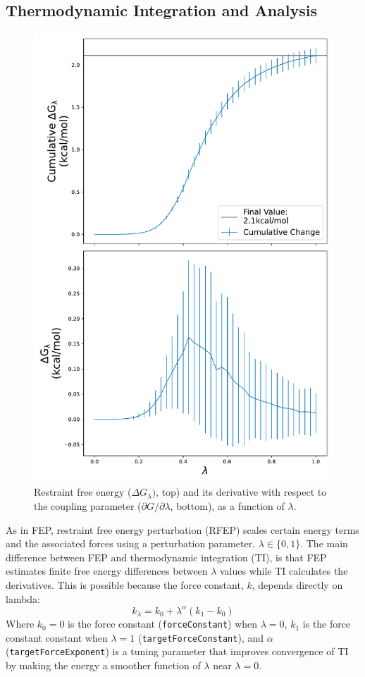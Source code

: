 \documentclass[9pt,tutorial]{Styling/livecoms}
\begin{document}
\subsection{Thermodynamic Integration and Analysis}
\begin{figure}[!htb]
    \includegraphics[width=0.95\linewidth]{RFEP}
    \caption{Restraint free energy ($\Delta G_\lambda)$, top) and its derivative with respect to the coupling parameter ($\partial G/\partial\lambda$, bottom), as a function of $\lambda$.}\label{fig:RFEP2}
\end{figure}
As in FEP, restraint free energy perturbation (RFEP) scales certain energy terms and the associated forces using a perturbation parameter, $\lambda\in \{0,1\}$.
The main difference between FEP and thermodynamic integration (TI), is that FEP estimates finite free energy differences between $\lambda$ values while TI calculates the derivatives. This is possible because the force constant, $k$, depends directly on lambda:
 \begin{equation}\label{eq:kl}
     k_\lambda = k_0 + \lambda^\alpha (k_1-k_0)
 \end{equation}
Where $k_0 = 0$ is the force constant (\texttt{forceConstant}) when $\lambda=0$, $k_1$ is the  force constant constant when $\lambda=1$ (\texttt{targetForceConstant}), and $\alpha$ (\texttt{targetForceExponent}) is a tuning parameter that improves convergence of TI by making the energy a smoother function of $\lambda$ near $\lambda=0$.
\end{document}
